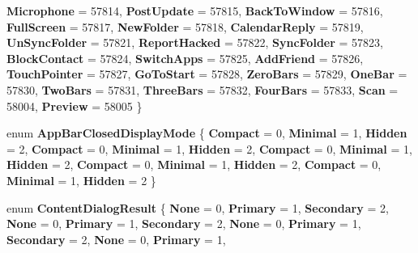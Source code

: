 \begin{DoxyCompactItemize}
\newline
{\bfseries Microphone} = 57814, 
{\bfseries Post\+Update} = 57815, 
{\bfseries Back\+To\+Window} = 57816, 
{\bfseries Full\+Screen} = 57817, 
\newline
{\bfseries New\+Folder} = 57818, 
{\bfseries Calendar\+Reply} = 57819, 
{\bfseries Un\+Sync\+Folder} = 57821, 
{\bfseries Report\+Hacked} = 57822, 
\newline
{\bfseries Sync\+Folder} = 57823, 
{\bfseries Block\+Contact} = 57824, 
{\bfseries Switch\+Apps} = 57825, 
{\bfseries Add\+Friend} = 57826, 
\newline
{\bfseries Touch\+Pointer} = 57827, 
{\bfseries Go\+To\+Start} = 57828, 
{\bfseries Zero\+Bars} = 57829, 
{\bfseries One\+Bar} = 57830, 
\newline
{\bfseries Two\+Bars} = 57831, 
{\bfseries Three\+Bars} = 57832, 
{\bfseries Four\+Bars} = 57833, 
{\bfseries Scan} = 58004, 
\newline
{\bfseries Preview} = 58005
 \}
\item 
\mbox{\label{namespace_windows_1_1_u_i_1_1_xaml_1_1_controls_a69ed41c1bfc769995c091035ab6dd837}} 
enum {\bfseries App\+Bar\+Closed\+Display\+Mode} \{ \newline
{\bfseries Compact} = 0, 
{\bfseries Minimal} = 1, 
{\bfseries Hidden} = 2, 
{\bfseries Compact} = 0, 
\newline
{\bfseries Minimal} = 1, 
{\bfseries Hidden} = 2, 
{\bfseries Compact} = 0, 
{\bfseries Minimal} = 1, 
\newline
{\bfseries Hidden} = 2, 
{\bfseries Compact} = 0, 
{\bfseries Minimal} = 1, 
{\bfseries Hidden} = 2, 
\newline
{\bfseries Compact} = 0, 
{\bfseries Minimal} = 1, 
{\bfseries Hidden} = 2
 \}
\item 
\mbox{\label{namespace_windows_1_1_u_i_1_1_xaml_1_1_controls_aeb84959a5f71279742b9e779903775a6}} 
enum {\bfseries Content\+Dialog\+Result} \{ \newline
{\bfseries None} = 0, 
{\bfseries Primary} = 1, 
{\bfseries Secondary} = 2, 
{\bfseries None} = 0, 
\newline
{\bfseries Primary} = 1, 
{\bfseries Secondary} = 2, 
{\bfseries None} = 0, 
{\bfseries Primary} = 1, 
\newline
{\bfseries Secondary} = 2, 
{\bfseries None} = 0, 
{\bfseries Primary} = 1, 

\end{DoxyCompactItemize}
